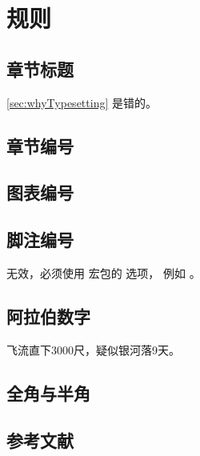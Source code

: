 \chapter{规则}

\section{章节标题}
\ref{sec:whyTypesetting} 是错的。

\section{章节编号}

\section{图表编号}
\section{脚注编号}
\begin{Code}
\end{Code}
无效，必须使用  宏包的  选项，
例如 。

\section{阿拉伯数字}

飞流直下3000尺，疑似银河落9天。

\section{全角与半角}

\section{参考文献}

